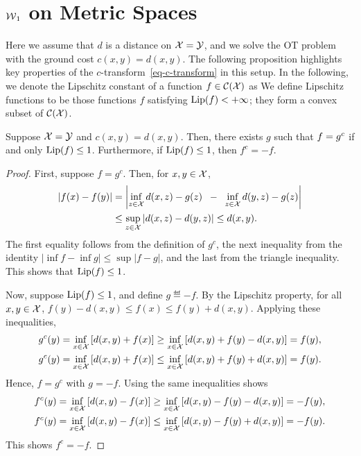 \section{$\operatorname{\mathcal{W}}_1$ on Metric Spaces}
\label{sec-w1-metric}

Here we assume that $d$ is a distance on $\mathcal{X}=\mathcal{Y}$, and we solve the OT problem with the ground cost $c(x,y)=d(x,y)$. The following proposition highlights key properties of the $c$-transform~\eqref{eq-c-transform} in this setup. In the following, we denote the Lipschitz constant of a function $f \in \mathcal{C}(\mathcal{X})$ as
We define Lipschitz functions to be those functions $f$ satisfying $\operatorname{Lip}(f) < +\infty$; they form a convex subset of $\mathcal{C}(\mathcal{X})$.

\begin{prop}Suppose $\mathcal{X}=\mathcal{Y}$ and $c(x,y)=d(x,y)$. 
Then, there exists $g$ such that $f = g^c$ if and only $\operatorname{Lip}(f) \leq 1$. 
Furthermore, if $\operatorname{Lip}(f)\leq1$, then $f^c=-f$.
\end{prop}

\begin{proof}
First, suppose $f=g^c$.  Then, for $x,y\in \mathcal{X}$,
\begin{align*}
|f(x)-f(y)|&=\left|\inf_{z\in\mathcal{X}} d(x,z)-g(z) \;\; - \;\;\inf_{z\in \mathcal{X}} d(y,z)-g(z) \right|\\
&\leq \sup_{z\in\mathcal{X}} |d(x,z)-d(y,z)|\leq d(x,y).
\end{align*}
The first equality follows from the definition of $g^c$, the next inequality from the identity $|\inf f-\inf g|\leq\sup|f-g|$, and the last from the triangle inequality. This shows that $\operatorname{Lip}(f)\leq1$.

Now, suppose $\operatorname{Lip}(f)\leq1$, and define $g\eqdef -f$. By the Lipschitz property, for all $x,y\in\mathcal{X}$,
$f(y)-d(x,y)\leq f(x)\leq f(y)+d(x,y)$.
Applying these inequalities,
\begin{align*}
g^c(y)&=\inf_{x\in\mathcal{X}}\left[ d(x,y) + f(x) \right]
\geq\inf_{x\in \mathcal{X}} \left[  d(x,y)+f(y)-d(x,y)\right]=f(y),\\
g^c(y)&=\inf_{x\in\mathcal{X}}\left[ d(x,y) + f(x) \right]
\leq \inf_{x\in\mathcal{X}}\left[ d(x,y) + f(y)+d(x,y) \right]=f(y).
\end{align*}
Hence, $f=g^c$ with $g=-f$.  Using the same inequalities shows
\begin{align*}
f^c(y)&=\inf_{x\in\mathcal{X}}\left[ d(x,y) - f(x) \right]
\geq\inf_{x\in \mathcal{X}} \left[  d(x,y)-f(y)-d(x,y)\right]=-f(y),\\
f^c(y)&=\inf_{x\in\mathcal{X}}\left[ d(x,y) - f(x) \right]
\leq \inf_{x\in\mathcal{X}}\left[ d(x,y) - f(y)+d(x,y) \right]=-f(y).
\end{align*}
This shows $f^c=-f$.
\end{proof}

